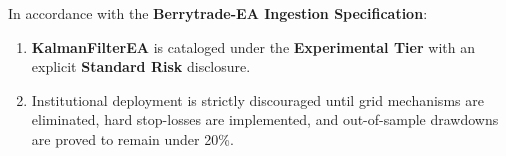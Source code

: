 \documentclass[11pt,a4paper]{article}
\begin{document}
In accordance with the \textbf{Berrytrade-EA Ingestion Specification}:
\begin{enumerate}
    \item \textbf{KalmanFilterEA} is cataloged under the \textbf{Experimental Tier} with an explicit \textbf{Standard Risk} disclosure.
    \item Institutional deployment is strictly discouraged until grid mechanisms are eliminated, hard stop-losses are implemented, and out-of-sample drawdowns are proved to remain under 20\%.
\end{enumerate}



\end{document}
